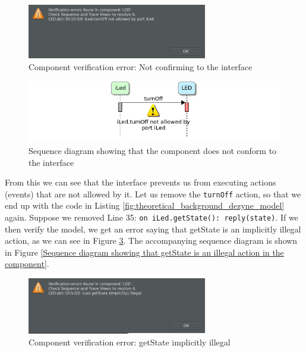 \documentclass[12pt]{scrreprt}
\begin{document}
\begin{appendices}
\begin{figure}[H]
    \centering
    \includegraphics[width=0.7\textwidth]{Figures/theoretical_background/led_verification_error.png}
    \caption{Component verification error: Not confirming to the interface}
    \label{Component verification error: Not confirming to the interface}
\end{figure}

\begin{figure}[H]
    \centering
    \includegraphics[width=\textwidth]{Figures/theoretical_background/verification_error_in_sequence_diagram.png}
    \caption{Sequence diagram showing that the component does not conform to the interface}
    \label{Sequence diagram showing that the component does not conform to the interface}
\end{figure}

From this we can see that the interface prevents us from executing actions (events) that are not allowed by it. Let us remove the \texttt{turnOff} action, so that we end up with the code in Listing \ref{fig:theoretical_background_dezyne_model} again. Suppose we removed Line 35: \texttt{on iLed.getState(): reply(state)}. If we then verify the model, we get an error saying that getState is an implicitly illegal action, as we can see in Figure \ref{Component verification error: getState implicitly illegal}. The accompanying sequence diagram is shown in Figure \ref{Sequence diagram showing that getState is an illegal action in the component}.

\begin{figure}[H]
    \centering
    \includegraphics[width=0.7\textwidth]{Figures/theoretical_background/led_verfication_error_getState.png}
    \caption{Component verification error: getState implicitly illegal}
    \label{Component verification error: getState implicitly illegal}
\end{figure}


\end{appendices}
\end{document}

